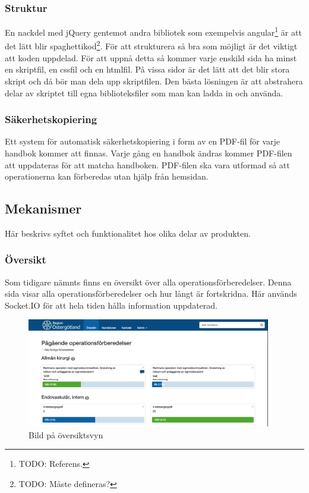 \subsubsection{Struktur}
En nackdel med jQuery gentemot andra bibliotek som exempelvis angular\footnote{TODO: Referens.} är att det lätt blir spaghettikod\footnote{TODO: Måste defineras?}.
För att strukturera så bra som möjligt är det viktigt att koden uppdelad.
För att uppnå detta så kommer varje enskild sida ha minst en skriptfil, en cssfil och en htmlfil.
På vissa sidor är det lätt att det blir stora skript och då bör man dela upp skriptfilen.
Den bästa lösningen är att abstrahera delar av skriptet till egna biblioteksfiler som man kan ladda in och använda.

\subsubsection{Säkerhetskopiering}
Ett system för automatisk säkerhetskopiering i form av en PDF-fil för varje handbok kommer att finnas.
Varje gång en handbok ändras kommer PDF-filen att uppdateras för att matcha handboken.
PDF-filen ska vara utformad så att operationerna kan förberedas utan hjälp från hemsidan.

\subsection{Mekanismer}
Här beskrivs syftet och funktionalitet hos olika delar av produkten.

\subsubsection{Översikt}
Som tidigare nämnts finns en översikt över alla operationsförberedelser.
Denna sida visar alla operationsförberedelser och hur långt är fortskridna.
Här används Socket.IO för att hela tiden hålla information uppdaterad.

\begin{figure}[h!]
  \centering
  \includegraphics[width=0.95\textwidth]{images/site/overview.png}
  \caption{Bild på översiktsvyn}
  \label{fig:siteoverview}
\end{figure}

